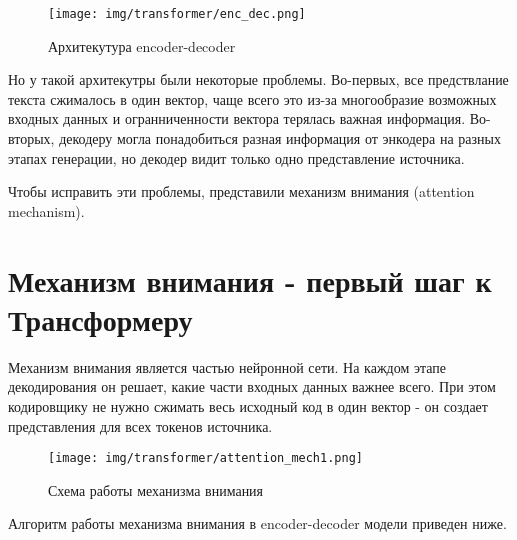 \documentclass[PMI,KR]{HSEUniversity}
\begin{document}
\begin{figure}[h]
    \centering
    \texttt{[image: img/transformer/enc\_dec.png]}
    \caption{Архитекутура encoder-decoder}
\end{figure}

Но у такой архитекутры были некоторые проблемы. Во-первых, все предствлание текста сжималось в один вектор, чаще всего это из-за многообразие возможных входных данных и огранниченности вектора терялась важная информация. Во-вторых, декодеру могла понадобиться разная информация от энкодера на разных этапах генерации, но декодер видит только одно представление источника. 

Чтобы исправить эти проблемы, представили механизм внимания (attention mechanism\cite{attention:2014}). 

\section{Механизм внимания - первый шаг к Трансформеру}

Механизм внимания является частью нейронной сети. На каждом этапе декодирования он решает, какие части входных данных важнее всего. При этом кодировщику не нужно сжимать весь исходный код в один вектор - он создает представления для всех токенов источника.

\begin{figure}[h]
    \centering
    \texttt{[image: img/transformer/attention\_mech1.png]}
    \caption{Схема работы механизма внимания}
\end{figure}

\newpage
Алгоритм работы механизма внимания в encoder-decoder модели приведен ниже.
\end{document}
